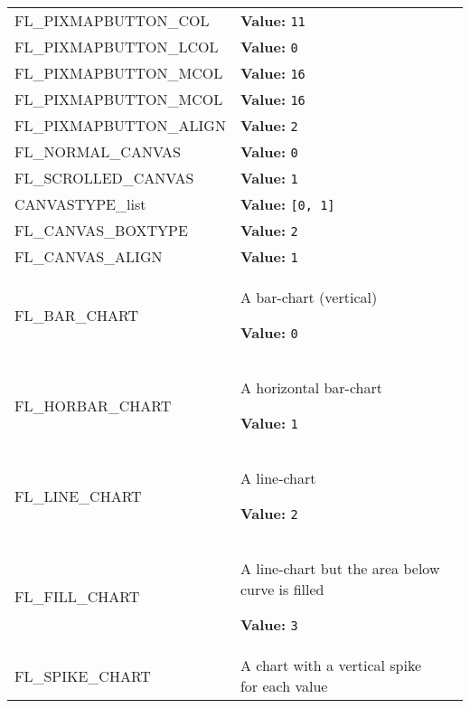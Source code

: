 \begin{longtable}{|p{\varnamewidth}|p{\vardescrwidth}|l}
\raggedright F\-L\-\_\-P\-I\-X\-M\-A\-P\-B\-U\-T\-T\-O\-N\-\_\-C\-O\-L\-2\- & \raggedright \textbf{Value:} 
{\tt 11}&\\
\cline{1-2}
\raggedright F\-L\-\_\-P\-I\-X\-M\-A\-P\-B\-U\-T\-T\-O\-N\-\_\-L\-C\-O\-L\- & \raggedright \textbf{Value:} 
{\tt 0}&\\
\cline{1-2}
\raggedright F\-L\-\_\-P\-I\-X\-M\-A\-P\-B\-U\-T\-T\-O\-N\-\_\-M\-C\-O\-L\-1\- & \raggedright \textbf{Value:} 
{\tt 16}&\\
\cline{1-2}
\raggedright F\-L\-\_\-P\-I\-X\-M\-A\-P\-B\-U\-T\-T\-O\-N\-\_\-M\-C\-O\-L\-2\- & \raggedright \textbf{Value:} 
{\tt 16}&\\
\cline{1-2}
\raggedright F\-L\-\_\-P\-I\-X\-M\-A\-P\-B\-U\-T\-T\-O\-N\-\_\-A\-L\-I\-G\-N\- & \raggedright \textbf{Value:} 
{\tt 2}&\\
\cline{1-2}
\raggedright F\-L\-\_\-N\-O\-R\-M\-A\-L\-\_\-C\-A\-N\-V\-A\-S\- & \raggedright \textbf{Value:} 
{\tt 0}&\\
\cline{1-2}
\raggedright F\-L\-\_\-S\-C\-R\-O\-L\-L\-E\-D\-\_\-C\-A\-N\-V\-A\-S\- & \raggedright \textbf{Value:} 
{\tt 1}&\\
\cline{1-2}
\raggedright C\-A\-N\-V\-A\-S\-T\-Y\-P\-E\-\_\-l\-i\-s\-t\- & \raggedright \textbf{Value:} 
{\tt \texttt{[}0\texttt{, }1\texttt{]}}&\\
\cline{1-2}
\raggedright F\-L\-\_\-C\-A\-N\-V\-A\-S\-\_\-B\-O\-X\-T\-Y\-P\-E\- & \raggedright \textbf{Value:} 
{\tt 2}&\\
\cline{1-2}
\raggedright F\-L\-\_\-C\-A\-N\-V\-A\-S\-\_\-A\-L\-I\-G\-N\- & \raggedright \textbf{Value:} 
{\tt 1}&\\
\cline{1-2}
\raggedright F\-L\-\_\-B\-A\-R\-\_\-C\-H\-A\-R\-T\- & \raggedright A bar-chart (vertical)

\textbf{Value:} 
{\tt 0}&\\
\cline{1-2}
\raggedright F\-L\-\_\-H\-O\-R\-B\-A\-R\-\_\-C\-H\-A\-R\-T\- & \raggedright A horizontal bar-chart

\textbf{Value:} 
{\tt 1}&\\
\cline{1-2}
\raggedright F\-L\-\_\-L\-I\-N\-E\-\_\-C\-H\-A\-R\-T\- & \raggedright A line-chart

\textbf{Value:} 
{\tt 2}&\\
\cline{1-2}
\raggedright F\-L\-\_\-F\-I\-L\-L\-\_\-C\-H\-A\-R\-T\- & \raggedright A line-chart but the area below curve is filled

\textbf{Value:} 
{\tt 3}&\\
\cline{1-2}
\raggedright F\-L\-\_\-S\-P\-I\-K\-E\-\_\-C\-H\-A\-R\-T\- & \raggedright A chart with a vertical spike for each value


\end{longtable}
